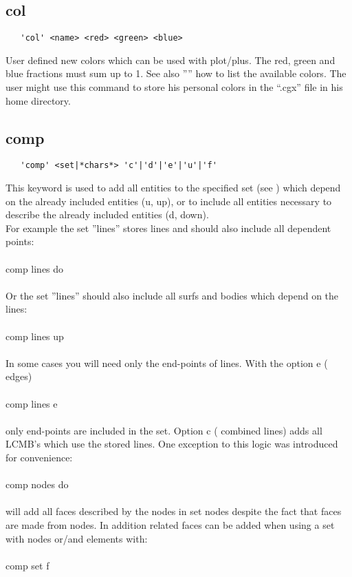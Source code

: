 \documentclass{article}
\begin{document}
\subsection{\label{col}col}
\begin{verbatim}
   'col' <name> <red> <green> <blue>
\end{verbatim}
User defined new colors which can be used with plot/plus. The red, green and blue fractions must sum up to 1. See also '''' how to list the available colors. The user might use this command to store his personal colors in the ``.cgx'' file in his home directory.

\subsection{\label{comp}comp}
\begin{verbatim}
   'comp' <set|*chars*> 'c'|'d'|'e'|'u'|'f'
\end{verbatim}
This keyword is used to add all entities to the specified set (see
) which depend on the already included entities (u, up),
or to include all entities necessary to describe the already included entities
(d, down).\\For example the set ''lines'' stores lines and should also include
all dependent points:\\\\comp lines do\\\\Or the set ''lines'' should also
include all surfs and bodies which depend on the lines:\\\\comp lines up\\\\In
some cases you will need only the end-points of lines. With the option e (
edges)\\\\comp lines e\\\\ only end-points are included in the set. Option c (
combined lines) adds all LCMB's which use the stored lines. One exception to this logic was introduced for convenience:\\\\comp nodes do\\\\will add all faces described by the nodes in set nodes despite the fact that faces are made from nodes. In addition related faces can be added when using a set with nodes or/and elements with:\\\\comp set f\\\\
\end{document}
